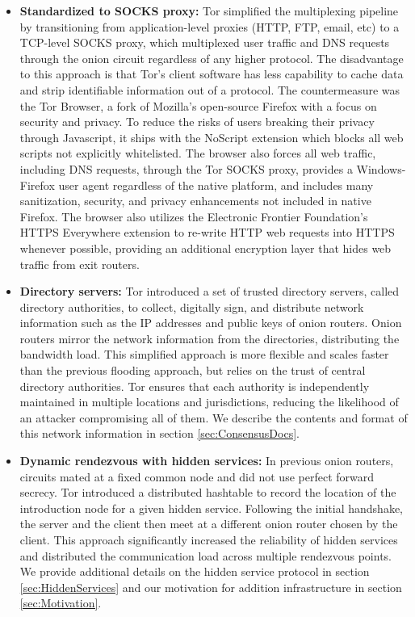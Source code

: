 \begin{itemize}
	\item \textbf{Standardized to SOCKS proxy:} Tor simplified the multiplexing pipeline by transitioning from application-level proxies (HTTP, FTP, email, etc) to a TCP-level SOCKS proxy, which multiplexed user traffic and DNS requests through the onion circuit regardless of any higher protocol. The disadvantage to this approach is that Tor's client software has less capability to cache data and strip identifiable information out of a protocol. The countermeasure was the Tor Browser, a fork of Mozilla's open-source Firefox with a focus on security and privacy. To reduce the risks of users breaking their privacy through Javascript, it ships with the NoScript extension which blocks all web scripts not explicitly whitelisted. The browser also forces all web traffic, including DNS requests, through the Tor SOCKS proxy, provides a Windows-Firefox user agent regardless of the native platform, and includes many sanitization, security, and privacy enhancements not included in native Firefox. The browser also utilizes the Electronic Frontier Foundation's HTTPS Everywhere extension to re-write HTTP web requests into HTTPS whenever possible, providing an additional encryption layer that hides web traffic from exit routers.
	\item \textbf{Directory servers:} Tor introduced a set of trusted directory servers, called directory authorities, to collect, digitally sign, and distribute network information such as the IP addresses and public keys of onion routers. Onion routers mirror the network information from the directories, distributing the bandwidth load. This simplified approach is more flexible and scales faster than the previous flooding approach, but relies on the trust of central directory authorities. Tor ensures that each authority is independently maintained in multiple locations and jurisdictions, reducing the likelihood of an attacker compromising all of them\cite{syverson2011peel}. We describe the contents and format of this network information in section \ref{sec:ConsensusDocs}.
	\item \textbf{Dynamic rendezvous with hidden services:} In previous onion routers, circuits mated at a fixed common node and did not use perfect forward secrecy. Tor introduced a distributed hashtable to record the location of the introduction node for a given hidden service. Following the initial handshake, the server and the client then meet at a different onion router chosen by the client. This approach significantly increased the reliability of hidden services and distributed the communication load across multiple rendezvous points\cite{dingledine2004tor}. We provide additional details on the hidden service protocol in section \ref{sec:HiddenServices} and our motivation for addition infrastructure in section \ref{sec:Motivation}.
\end{itemize}

